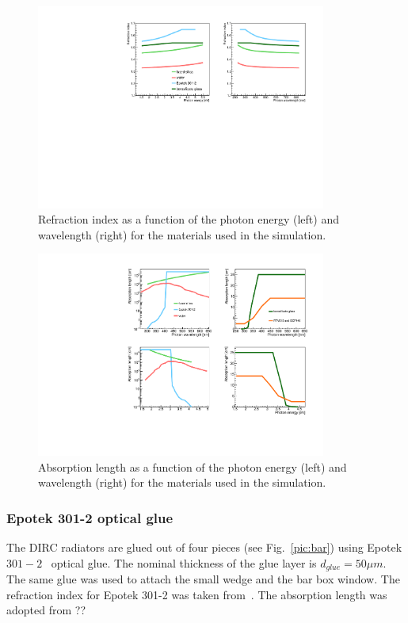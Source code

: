 \begin{figure}[!h]
\centering
\includegraphics[angle=0,width=0.85\textwidth]{pics/refind1.pdf}
\caption{\label{pic:mat1}
Refraction index as a function of the photon energy (left) and wavelength (right) for the materials used in the simulation.
}
\end{figure}

\begin{figure}[!h]
\centering
\includegraphics[angle=0,width=0.85\textwidth]{pics/ablen1.pdf}
\caption{\label{pic:mat2}
Absorption length as a function of the photon energy (left) and wavelength (right) for the materials used in the simulation.
}
\end{figure}

\subsubsection*{Epotek 301-2 optical glue}

The \babar DIRC radiators are glued out of four pieces (see Fig.~\ref{pic:bar}) using Epotek $301-2$~\cite{Epotek} optical glue. The nominal thickness of the glue layer is $d_{glue} = 50 \mu m$. The same glue was used to attach the small wedge and the bar box window. The refraction index for Epotek 301-2 was taken from~\cite{EpotekData}. The absorption length was adopted from ??

